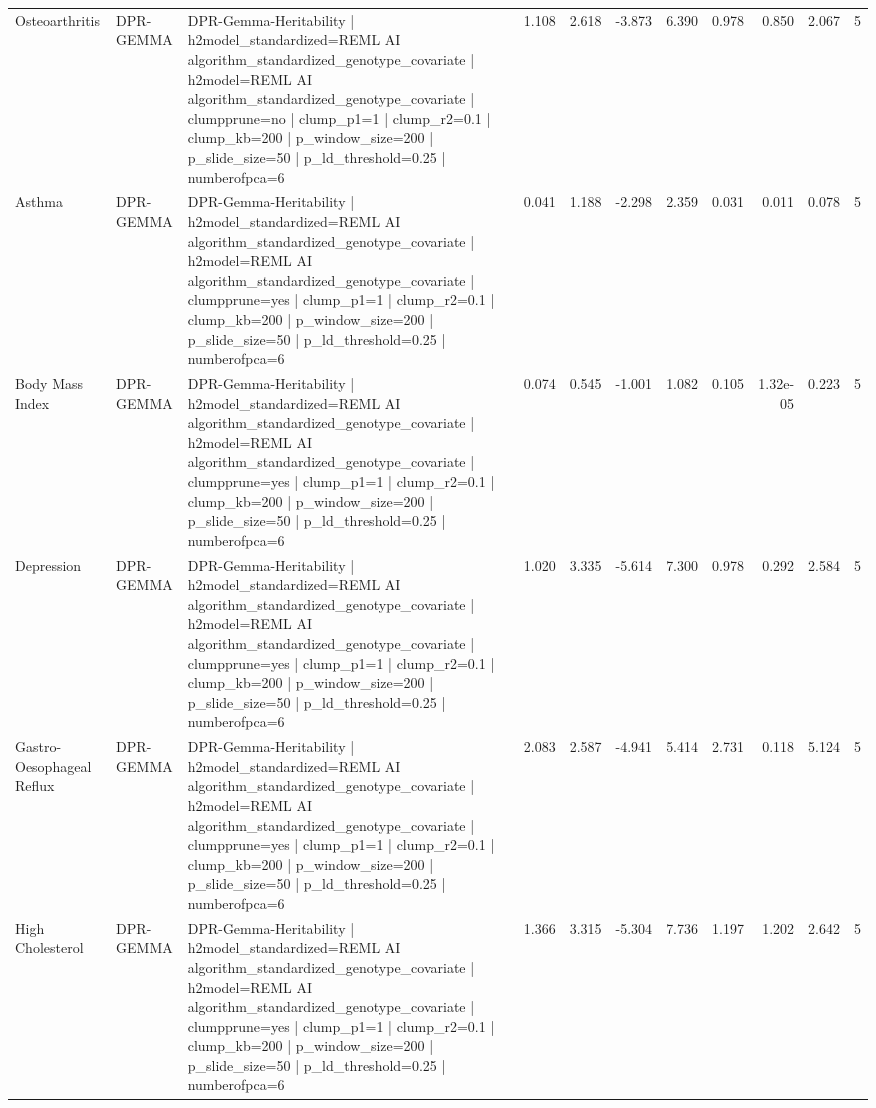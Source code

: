 \begin{landscape}
\begin{longtable}{p{2.4cm}p{1.8cm}p{6.0cm}rrrrrrrr}
Osteoarthritis & DPR-GEMMA & DPR-Gemma-Heritability | h2model\_standardized=REML AI algorithm\_standardized\_genotype\_covariate | h2model=REML AI algorithm\_standardized\_genotype\_covariate | clumpprune=no | clump\_p1=1 | clump\_r2=0.1 | clump\_kb=200 | p\_window\_size=200 | p\_slide\_size=50 | p\_ld\_threshold=0.25 | numberofpca=6 & 1.108 & 2.618 & -3.873 & 6.390 & 0.978 & 0.850 & 2.067 & 5 \\
Asthma & DPR-GEMMA & DPR-Gemma-Heritability | h2model\_standardized=REML AI algorithm\_standardized\_genotype\_covariate | h2model=REML AI algorithm\_standardized\_genotype\_covariate | clumpprune=yes | clump\_p1=1 | clump\_r2=0.1 | clump\_kb=200 | p\_window\_size=200 | p\_slide\_size=50 | p\_ld\_threshold=0.25 | numberofpca=6 & 0.041 & 1.188 & -2.298 & 2.359 & 0.031 & 0.011 & 0.078 & 5 \\
Body Mass Index & DPR-GEMMA & DPR-Gemma-Heritability | h2model\_standardized=REML AI algorithm\_standardized\_genotype\_covariate | h2model=REML AI algorithm\_standardized\_genotype\_covariate | clumpprune=yes | clump\_p1=1 | clump\_r2=0.1 | clump\_kb=200 | p\_window\_size=200 | p\_slide\_size=50 | p\_ld\_threshold=0.25 | numberofpca=6 & 0.074 & 0.545 & -1.001 & 1.082 & 0.105 & 1.32e-05 & 0.223 & 5 \\
Depression & DPR-GEMMA & DPR-Gemma-Heritability | h2model\_standardized=REML AI algorithm\_standardized\_genotype\_covariate | h2model=REML AI algorithm\_standardized\_genotype\_covariate | clumpprune=yes | clump\_p1=1 | clump\_r2=0.1 | clump\_kb=200 | p\_window\_size=200 | p\_slide\_size=50 | p\_ld\_threshold=0.25 | numberofpca=6 & 1.020 & 3.335 & -5.614 & 7.300 & 0.978 & 0.292 & 2.584 & 5 \\
Gastro-Oesophageal Reflux & DPR-GEMMA & DPR-Gemma-Heritability | h2model\_standardized=REML AI algorithm\_standardized\_genotype\_covariate | h2model=REML AI algorithm\_standardized\_genotype\_covariate | clumpprune=yes | clump\_p1=1 | clump\_r2=0.1 | clump\_kb=200 | p\_window\_size=200 | p\_slide\_size=50 | p\_ld\_threshold=0.25 | numberofpca=6 & 2.083 & 2.587 & -4.941 & 5.414 & 2.731 & 0.118 & 5.124 & 5 \\
High Cholesterol & DPR-GEMMA & DPR-Gemma-Heritability | h2model\_standardized=REML AI algorithm\_standardized\_genotype\_covariate | h2model=REML AI algorithm\_standardized\_genotype\_covariate | clumpprune=yes | clump\_p1=1 | clump\_r2=0.1 | clump\_kb=200 | p\_window\_size=200 | p\_slide\_size=50 | p\_ld\_threshold=0.25 | numberofpca=6 & 1.366 & 3.315 & -5.304 & 7.736 & 1.197 & 1.202 & 2.642 & 5 \\

\end{longtable}
\end{landscape}
